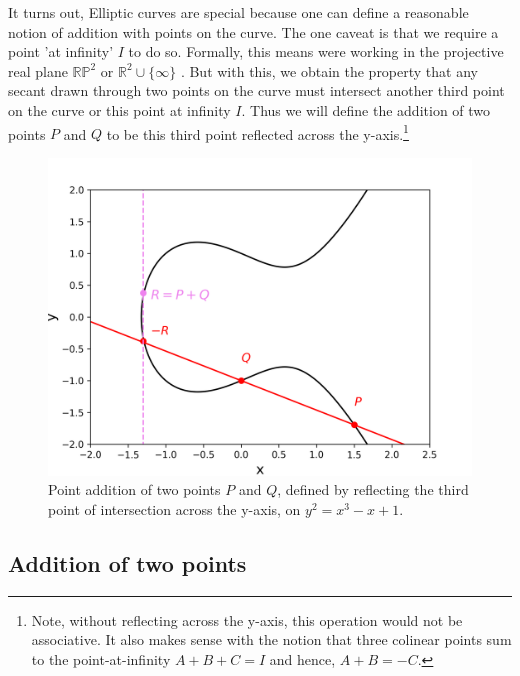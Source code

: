 \documentclass[11pt, a4paper]{report}
\begin{document}
It turns out, Elliptic curves are special because one can define a reasonable notion of addition with points on the curve. The one caveat is that we require a point 'at infinity' $I$ to do so. Formally, this means were working in the projective real plane $\mathbb{RP}^2$ or $\mathbb{R}^2 \cup \lbrace \infty \rbrace$ . But with this, we obtain the property that any secant drawn through two points on the curve must intersect another third point on the curve or this point at infinity $I$. Thus we will define the addition of two points $P$ and $Q$ to be this third point reflected across the y-axis.\footnote{Note, without reflecting across the y-axis, this operation would not be associative. It also makes sense with the notion that three colinear points sum to the point-at-infinity $A+B+C=I$ and hence, $A+B=-C$.}

\begin{figure}[ht]
\begin{center}
\includegraphics[width=\linewidth]{grouplaw.png} 
\caption{Point addition of two points $P$ and $Q$, defined by reflecting the third point of intersection across the y-axis, on $y^2 = x^3 -x+1$.}
\label{fig:additionEC}
\end{center}
\end{figure}

\subsection{Addition of two points}
\end{document}
